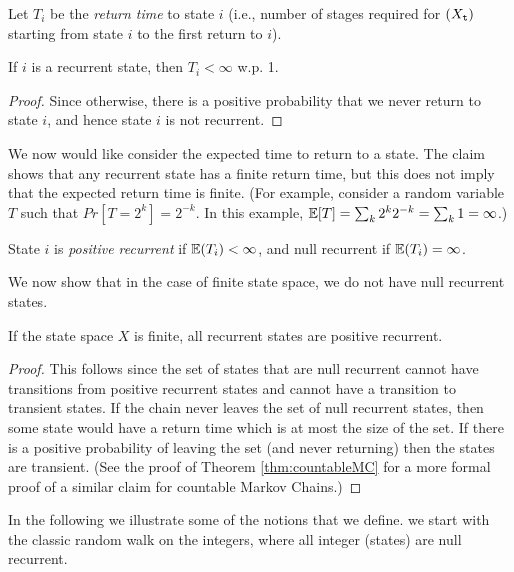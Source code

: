 \begin{definition}
    Let ${T_i}$ be the {\em return time} to state $i$  (i.e., number of stages
required for $({X_{\tt t}})$ starting from state $i$ to the first
return to $i$).
\end{definition} 

\begin{claim}
If $i$ is a recurrent
state, then ${T_i} < \infty $ w.p. 1.
\end{claim}
\begin{proof}
Since otherwise, there is a positive probability that we never
return to state $i$, and hence state $i$ is not recurrent.  
\end{proof}
We now would like consider the expected time to return to a state.
The claim shows that any recurrent state has a finite return time, 
but this does not imply that the expected return time is finite.
(For example, consider a random variable $T$ such that $Pr[T=2^k]=2^{-k}$. 
In this example, $\mathbb{E}[T]=\sum_k 2^k2^{-k}=\sum_k 1 =\infty$.)
\begin{definition}
    State $i$ is \emph{positive recurrent} if  $\mathbb{E}({T_i}) < \infty $,
and null recurrent if $\mathbb{E}({T_i}) = \infty $.
\end{definition}
We now show that in the case of finite state space, we do not have null recurrent states.
\begin{claim}\label{claim:finite_states_positive_recurrent}
    If the state space $X$
is finite, all recurrent states are positive recurrent.
\end{claim}
\begin{proof}
    This follows since the set of states that are null recurrent cannot
have transitions from positive recurrent states and cannot have a transition to transient states. If the chain never leaves the set of null recurrent states, then some state would have a return time which is at most the size of the set. If there is a positive probability of leaving the set (and never returning) then the states are transient. (See the proof of Theorem \ref{thm:countableMC} for a more formal proof of a similar claim for countable Markov Chains.)
\end{proof}


In the following we illustrate some of the notions that we define. we start with the classic random walk on the integers, where all integer (states) are null recurrent.

